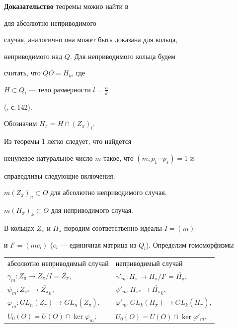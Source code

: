 {\bf Доказательство} теоремы можно найти в \cite{Pop2} 


для абсолютно неприводимого


случая, аналогично она может быть доказана для кольца,


неприводимого над $Q$. Для неприводимого кольца будем


считать, что $QO=H_k$, где


$H\subset Q_l$ --- тело размерности $l=\frac{n}{k}$ 


(\cite{Sup}, с.\,142).


Обозначим $H_{\pi}=H\cap (Z_{\pi})_l$. 


Из теоремы 1 легко следует, что найдется


ненулевое натуральное число $m$ такое, что $(m,p_1\cdots p_s)=1$ и


справедливы следующие включения:





$m(Z_{\pi})_n\subset O$ для абсолютно неприводимого случая,


$m(H_{\pi})_k \subset O$ для неприводимого случая.





В кольцах $Z_{\pi}$ и $H_{\pi}$ породим соответственно идеалы $I=(m)$


и $I'=(me_l)$ ($e_l$ --- единичная матрица из $Q_l$). Определим гомоморфизмы


\medskip





\begin{center}


\begin{tabular}{ll}


абсолютно неприводимый случай & неприводимый случай \\[2mm]


$\gamma_m : Z_{\pi} \longrightarrow Z_{\pi}/I=\overline{Z_{\pi}}$, & 


$\gamma '_m: H_{\pi} \longrightarrow H_{\pi}/I'= \overline{H_{\pi}}$,\\[2mm]


$\psi_m: Z_{\pi^n}\longrightarrow \overline{Z_{\pi}}_n$, & 


$\psi'_m: H_{\pi ^k} \longrightarrow \overline{H_{\pi}}_k$, \\[2mm]


$\varphi_m : GL_n(Z_{\pi})\longrightarrow GL_n(\overline{Z_{\pi}})$, & 


$\varphi '_m : GL_k(H_{\pi})\longrightarrow GL_k(\overline{H_{\pi}})$, \\[2mm]


$U_0(O)=U(O)\cap \ker\varphi_m$; & $U_0(O)=U(O)\cap \ker\varphi '_m$.


\end{tabular}


\end{center}








